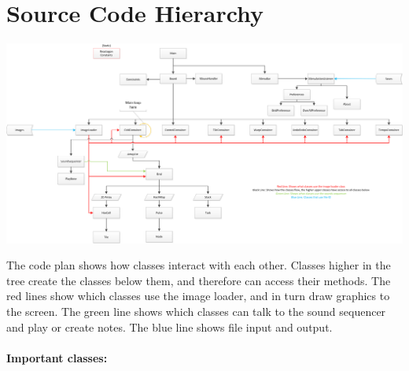 \documentclass[10pt,a4paper]{article}
\begin{document}
\section{Source Code Hierarchy}
\begin{center}
\includegraphics[scale=0.6, angle=270]{plan.png}
\end{center}
\pagebreak

The code plan shows how classes interact with each other. Classes higher in the tree create the classes below them, and therefore can access their methods. The red lines show which classes use the image loader, and in turn draw graphics to the screen. The green line shows which classes can talk to the sound sequencer and play or create notes. The blue line shows file input and output.\\
\\
\textbf{Important classes:}
\end{document}
